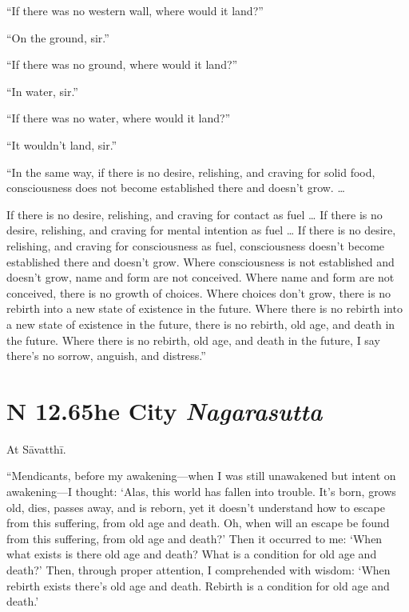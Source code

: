 \documentclass[12pt,openany]{book}%
\newcommand*{\suttatitleacronym}[1]{\smaller[2]{#1}\vspace*{.3em}}
\newcommand*{\suttatitletranslation}[1]{\linebreak{#1}}
\newcommand*{\suttatitleroot}[1]{\linebreak\smaller[2]\itshape{#1}}
\newcommand*{\tocacronym}[1]{\hspace*{-3.3em}{#1}\quad}
\newcommand*{\toctranslation}[1]{#1}
\newcommand*{\tocroot}[1]{(\textit{#1})}
\begin{document}
“If there was no western wall, where would it land?” 

“On the ground, sir.” 

“If there was no ground, where would it land?” 

“In water, sir.” 

“If there was no water, where would it land?” 

“It wouldn’t land, sir.” 

“In the same way, if there is no desire, relishing, and craving for solid food, consciousness does not become established there and doesn’t grow. … 

If there is no desire, relishing, and craving for contact as fuel … If there is no desire, relishing, and craving for mental intention as fuel … If there is no desire, relishing, and craving for consciousness as fuel, consciousness doesn’t become established there and doesn’t grow. Where consciousness is not established and doesn’t grow, name and form are not conceived. Where name and form are not conceived, there is no growth of choices. Where choices don’t grow, there is no rebirth into a new state of existence in the future. Where there is no rebirth into a new state of existence in the future, there is no rebirth, old age, and death in the future. Where there is no rebirth, old age, and death in the future, I say there’s no sorrow, anguish, and distress.” 

%
\section*{{\suttatitleacronym SN 12.65}{\suttatitletranslation The City }{\suttatitleroot Nagarasutta}}
\addcontentsline{toc}{section}{\tocacronym{SN 12.65} \toctranslation{The City } \tocroot{Nagarasutta}}

At \textsanskrit{Sāvatthī}. 

“Mendicants, before my awakening—when I was still unawakened but intent on awakening—I thought: ‘Alas, this world has fallen into trouble. It’s born, grows old, dies, passes away, and is reborn, yet it doesn’t understand how to escape from this suffering, from old age and death. Oh, when will an escape be found from this suffering, from old age and death?’ Then it occurred to me: ‘When what exists is there old age and death? What is a condition for old age and death?’ Then, through proper attention, I comprehended with wisdom: ‘When rebirth exists there’s old age and death. Rebirth is a condition for old age and death.’ 
\end{document}
